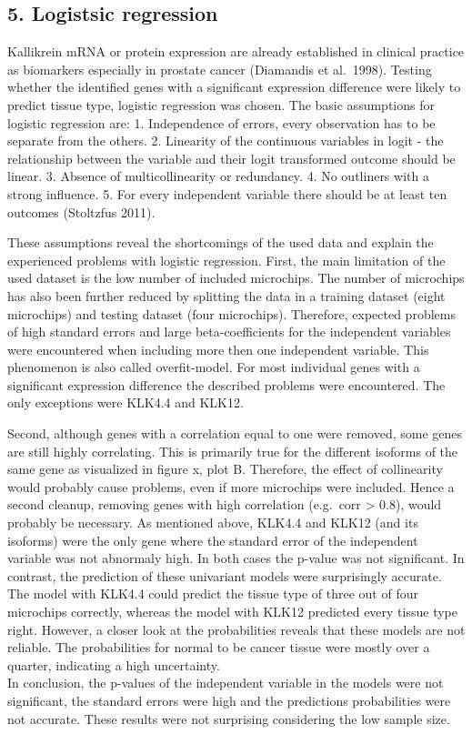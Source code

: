 \documentclass[
]{article}
\begin{document}
\hypertarget{logistsic-regression}{%
\subsection{5. Logistsic regression}\label{logistsic-regression}}

Kallikrein mRNA or protein expression are already established in
clinical practice as biomarkers especially in prostate cancer (Diamandis
et al.~1998). Testing whether the identified genes with a significant
expression difference were likely to predict tissue type, logistic
regression was chosen. The basic assumptions for logistic regression
are: 1. Independence of errors, every observation has to be separate
from the others. 2. Linearity of the continuous variables in logit - the
relationship between the variable and their logit transformed outcome
should be linear. 3. Absence of multicollinearity or redundancy. 4. No
outliners with a strong influence. 5. For every independent variable
there should be at least ten outcomes (Stoltzfus 2011).

These assumptions reveal the shortcomings of the used data and explain
the experienced problems with logistic regression. First, the main
limitation of the used dataset is the low number of included microchips.
The number of microchips has also been further reduced by splitting the
data in a training dataset (eight microchips) and testing dataset (four
microchips). Therefore, expected problems of high standard errors and
large beta-coefficients for the independent variables were encountered
when including more then one independent variable. This phenomenon is
also called overfit-model. For most individual genes with a significant
expression difference the described problems were encountered. The only
exceptions were KLK4.4 and KLK12.

Second, although genes with a correlation equal to one were removed,
some genes are still highly correlating. This is primarily true for the
different isoforms of the same gene as visualized in figure x, plot B.
Therefore, the effect of collinearity would probably cause problems,
even if more microchips were included. Hence a second cleanup, removing
genes with high correlation (e.g.~corr \textgreater{} 0.8), would
probably be necessary. As mentioned above, KLK4.4 and KLK12 (and its
isoforms) were the only gene where the standard error of the independent
variable was not abnormaly high. In both cases the p-value was not
significant. In contrast, the prediction of these univariant models were
surprisingly accurate. The model with KLK4.4 could predict the tissue
type of three out of four microchips correctly, whereas the model with
KLK12 predicted every tissue type right. However, a closer look at the
probabilities reveals that these models are not reliable. The
probabilities for normal to be cancer tissue were mostly over a quarter,
indicating a high uncertainty.\\
In conclusion, the p-values of the independent variable in the models
were not significant, the standard errors were high and the predictions
probabilities were not accurate. These results were not surprising
considering the low sample size.
\end{document}
